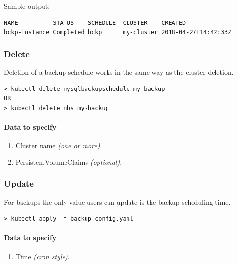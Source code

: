 \noindent Sample output:
\begin{lstlisting}
NAME          STATUS    SCHEDULE  CLUSTER    CREATED
bckp-instance Completed bckp      my-cluster 2018-04-27T14:42:33Z
\end{lstlisting}

\subsubsection*{Delete}

Deletion of a backup schedule works in the same way as the cluster deletion.

\begin{lstlisting}
> kubectl delete mysqlbackupschedule my-backup
OR
> kubectl delete mbs my-backup
\end{lstlisting}

\paragraph{Data to specify}
\begin{enumerate}
	\item Cluster name \textit{(one or more)}.
	\item PersistentVolumeClaims \textit{(optional)}.
\end{enumerate}

\subsubsection*{Update}

For backups the only value users can update is the backup
scheduling time.

\begin{lstlisting}
> kubectl apply -f backup-config.yaml
\end{lstlisting}

\paragraph{Data to specify}
\begin{enumerate}
    \item Time \textit{(cron style)}.
\end{enumerate}
